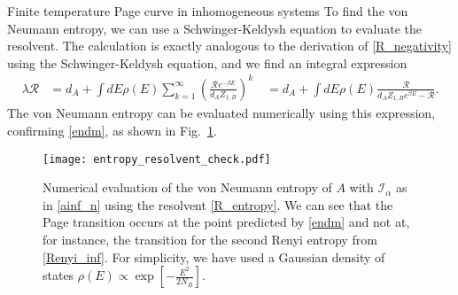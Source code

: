\documentclass[a4paper,11pt]{article}
\newcommand{\SV}[1]{\textcolor{red}{#1}}
\newcommand\al{{\alpha}}
\newcommand\sI{{\ensuremath{{\mathcal I}}}}
\newcommand\sR{{\mathcal R}}
\begin{document}
\begin{enumerate}
\begin{appendix}
\begin{section}{Finite temperature Page curve in inhomogeneous systems}
To find the von Neumann entropy, we can use a Schwinger-Keldysh equation to evaluate the resolvent. The calculation is exactly analogous to the derivation of \eqref{R_negativity} using the Schwinger-Keldysh equation, and we find an integral expression 
\begin{align}
 \lambda \sR &= d_{A} + \int dE \rho (E)\sum_{k = 1}^{\infty}\left( \frac{\sR e^{-\beta E}}{d_{A}Z_{1,B}}\right)^k
 \quad = d_{A} + \int dE \rho (E)\frac{\sR}{d_A Z_{1,B} e^{\beta E}-\sR}.
 \label{R_entropy}
\end{align}
The von Neumann entropy can be evaluated numerically using this expression, confirming \eqref{endm}, as shown in Fig.~\ref{fig:resolvent_checks_b}.

\begin{figure}[] 
\centering 
\texttt{[image: entropy\_resolvent\_check.pdf]}
\caption{Numerical evaluation of the von Neumann entropy of $A$ with $\sI_{\al}$ as in \eqref{ainf_n} using the resolvent \eqref{R_entropy}. We can see that the Page transition occurs at the point predicted by \eqref{endm} and not at, for instance, the transition for the second Renyi entropy from \eqref{Renyi_inf}. For simplicity, we have used a Gaussian density of states $\rho(E) \propto \exp\left[-\frac{E^2}{2N_B}\right]$. }
\label{fig:resolvent_checks_b}
\end{figure}


\end{section}
\end{appendix}
\end{enumerate}
\end{document}
